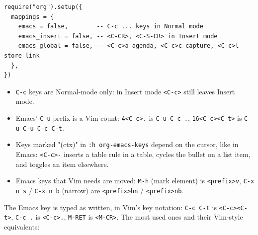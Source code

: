 \begin{verbatim}
require("org").setup({
  mappings = {
    emacs = false,        -- C-c ... keys in Normal mode
    emacs_insert = false, -- <C-CR>, <C-S-CR> in Insert mode
    emacs_global = false, -- <C-c>a agenda, <C-c>c capture, <C-c>l store link
  },
})
\end{verbatim}

\begin{itemize}
\item \texttt{C-c} keys are Normal-mode only: in Insert mode \texttt{<C-c>} still leaves
Insert mode.
\item Emacs' \texttt{C-u} prefix is a Vim count: \texttt{4<C-c>.} is \texttt{C-u C-c .},
\texttt{16<C-c><C-t>} is \texttt{C-u C-u C-c C-t}.
\item Keys marked "(ctx)" in \texttt{:h org-emacs-keys} depend on the cursor, like in
Emacs: \texttt{<C-c>-} inserts a table rule in a table, cycles the bullet on a
list item, and toggles an item elsewhere.
\item Emacs keys that Vim needs are moved: \texttt{M-h} (mark element) is
\texttt{<prefix>v}, \texttt{C-x n s} / \texttt{C-x n b} (narrow) are \texttt{<prefix>hn} /
\texttt{<prefix>nb}.
\end{itemize}

The Emacs key is typed as written, in Vim's key notation: \texttt{C-c C-t} is
\texttt{<C-c><C-t>}, \texttt{C-c .} is \texttt{<C-c>.}, \texttt{M-RET} is \texttt{<M-CR>}. The most used
ones and their Vim-style equivalents:

